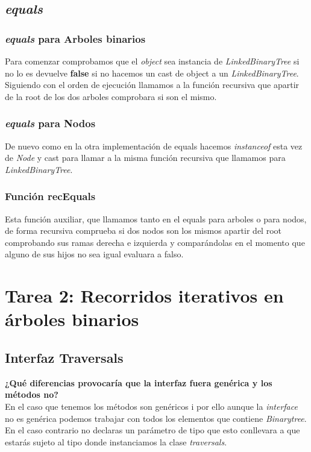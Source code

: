 \documentclass{article}
\begin{document}
    \subsection{\textit{equals}}
        \subsubsection{\textit{equals} para Arboles binarios}
            Para comenzar comprobamos que el \textit{object} sea instancia de
            \textit{LinkedBinaryTree} si no lo es devuelve \textbf{false} si no hacemos
            un cast de object a un \textit{LinkedBinaryTree}. 
            Siguiendo con el orden de ejecución llamamos a la función recursiva
            que apartir de la root de los dos arboles comprobara si son el mismo.
    \subsubsection{\textit{equals} para Nodos}
            De nuevo como en la otra implementación de equals hacemos
            \textit{instanceof} esta vez de \textit{Node} y cast para llamar a la misma
            función recursiva que llamamos para \textit{LinkedBinaryTree}.
    \subsubsection{Función recEquals}
            Esta función auxiliar, que llamamos tanto en el equals para arboles o
            para nodos, de forma recursiva comprueba si dos nodos
            son los mismos apartir del root comprobando sus ramas derecha e izquierda y
            comparándolas en el momento que alguno de sus hijos no sea igual
            evaluara a falso.
            \newline
\section{Tarea 2: Recorridos iterativos en árboles binarios}
    \subsection{Interfaz Traversals}
    \textbf{ ¿Qué diferencias provocaría que la interfaz fuera genérica y los
        métodos no?}\\
            En el caso que tenemos los métodos son genéricos i por ello aunque la
            \textit{interface} no es genérica podemos trabajar con todos los elementos
            que contiene \textit{Binarytree}. En el caso contrario no declaras un
            parámetro de tipo que esto conllevara a que estarás sujeto al tipo
            donde instanciamos la clase \textit{traversals}.
\end{document}

